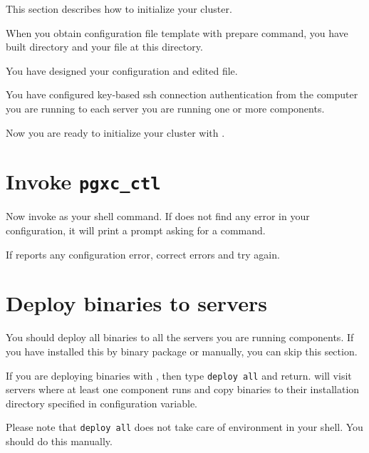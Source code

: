   This section describes how to initialize your \XC{} cluster.
  
  When you obtain  configuration file template with  prepare
  command, you have built  directory and your 
  file at this directory.
  
  You have designed your \XC{} configuration and edited  file.
  
  You have configured key-based ssh connection authentication from the computer you are running 
  to each server you are running one or more \XC{} components.
  
  Now you are ready to initialize your \XC{} cluster with .



\section{Invoke {\tt pgxc\_ctl}}

  Now invoke  as your shell command.
  If  does not find any error in your configuration, it will print a prompt
  asking for a command.
  
  If  reports any configuration error,
  correct errors and try again.
  


\section{\label{pgxcCtl:deploy}Deploy \XC{} binaries to servers}
  
  You should deploy all \XC{} binaries to all the servers you are running \XC{} components.
  If you have installed this by binary package or manually, you can skip this section.
  
  If you are deploying binaries with , then type \texttt{deploy all} and return.
   will visit servers where at least one \XC{} component runs
  and copy binaries to their installation directory specified in 
  configuration variable.
  
  Please note that \texttt{deploy all} does not take care of  environment in your shell.
  You should do this manually.


